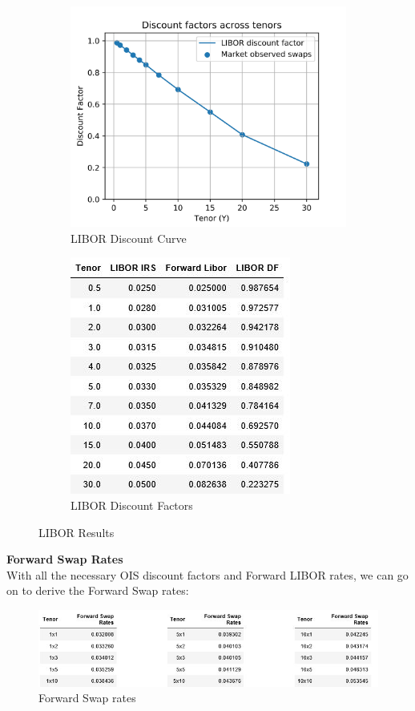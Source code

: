 \documentclass{article}
\begin{document}
\begin{figure}[h]
	\centering
	\begin{subfigure}{.5\textwidth}
		\centering
		\includegraphics[width=.75\linewidth]{./images/LIBOR_df.jpg}
		\caption{LIBOR Discount Curve}
		\label{fig:sub1}
	\end{subfigure}%
	\begin{subfigure}{.5\textwidth}
		\centering
		\includegraphics[width=.5\linewidth]{./images/LIBORtable.jpg}
		\caption{LIBOR Discount Factors}
		\label{fig:sub2}
	\end{subfigure}
	\caption{LIBOR Results}
	\label{fig:test}
\end{figure}


\noindent \textbf{Forward Swap Rates}\\

\noindent With all the necessary OIS discount factors and Forward LIBOR rates, we can go on to derive the Forward Swap rates:

\begin{figure}[ht]
	\centering
	\includegraphics[width= \linewidth]{./images/FwdSwaps.jpg}
	\caption{Forward Swap rates}
\end{figure}
\end{document}
